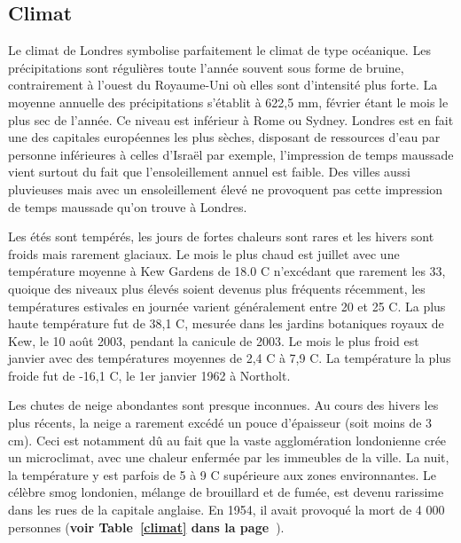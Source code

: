 \documentclass{article}
\begin{document}
\subsection{Climat}

Le climat de Londres symbolise parfaitement le climat de type océanique. Les précipitations sont régulières toute l'année souvent sous forme de bruine, contrairement à l'ouest du Royaume-Uni où elles sont d'intensité plus forte. La moyenne annuelle des précipitations s'établit à 622,5 mm, février étant le mois le plus sec de l'année. Ce niveau est inférieur à Rome ou Sydney. Londres est en fait une des capitales européennes les plus sèches, disposant de ressources d'eau par personne inférieures à celles d'Israël par exemple, l'impression de temps maussade vient surtout du fait que l'ensoleillement annuel est faible. Des villes aussi pluvieuses mais avec un ensoleillement élevé ne provoquent pas cette impression de temps maussade qu'on trouve à Londres.

Les étés sont tempérés, les jours de fortes chaleurs sont rares et les hivers sont froids mais rarement glaciaux. Le mois le plus chaud est juillet avec une température moyenne à Kew Gardens de 18.0 C n'excédant que rarement les 33, quoique des niveaux plus élevés soient devenus plus fréquents récemment, les températures estivales en journée varient généralement entre 20 et 25 C. La plus haute température fut de 38,1 C, mesurée dans les jardins botaniques royaux de Kew, le 10 août 2003, pendant la canicule de 2003. Le mois le plus froid est janvier avec des températures moyennes de 2,4 C à 7,9 C. La température la plus froide fut de -16,1 C, le 1er janvier 1962 à Northolt.

Les chutes de neige abondantes sont presque inconnues. Au cours des hivers les plus récents, la neige a rarement excédé un pouce d'épaisseur (soit moins de 3 cm). Ceci est notamment dû au fait que la vaste agglomération londonienne crée un microclimat, avec une chaleur enfermée par les immeubles de la ville. La nuit, la température y est parfois de 5 à 9 C supérieure aux zones environnantes. Le célèbre smog londonien, mélange de brouillard et de fumée, est devenu rarissime dans les rues de la capitale anglaise. En 1954, il avait provoqué la mort de 4 000 personnes (\textbf{voir Table~\ref{climat} dans la page~\pageref{climat}}).
\end{document}
